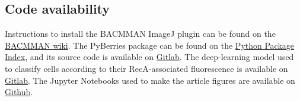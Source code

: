 \subsection*{Code availability}
Instructions to install the BACMMAN ImageJ plugin can be found on the \href{https://github.com/jeanollion/bacmman/wiki/Installation}{BACMMAN wiki}. The PyBerries package can be found on the \href{https://pypi.org/project/PyBerries/}{Python Package Index}, and its source code is available on \href{https://gitlab.com/MEKlab/pyberries}{Gitlab}. The deep-learning model used to classify cells according to their RecA-associated fluorescence is available on \href{https://gitlab.com/MEKlab/bacmman-object-classifier}{Gitlab}. The Jupyter Notebooks used to make the article figures are available on \href{https://github.com/DanielThedie/RecB_article}{Github}.


